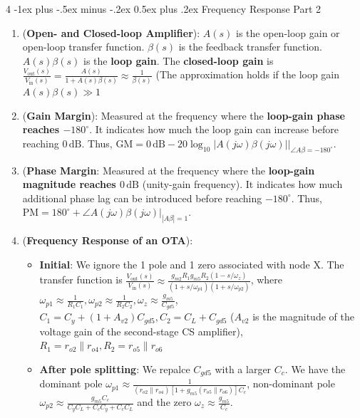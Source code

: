 \documentclass[10pt, landscape]{article}
\makeatletter
\renewcommand{\section}{\@startsection{section}{1}{0mm}%
                                {-1ex plus -.5ex minus -.2ex}%
                                {0.5ex plus .2ex}%
                                {\normalfont\large\bfseries}}
\makeatother
\begin{document}
\begin{multicols}{4}
\section{Frequency Response Part 2}
\begin{enumerate}
    \item (\textbf{Open- and Closed-loop Amplifier}):
    $A(s)$ is the open-loop gain or open-loop transfer function. $\beta(s)$ is the feedback transfer function. $A(s)\beta(s)$ is the \textbf{loop gain}. The \textbf{closed-loop gain} is $\frac{V_{\text{out}}(s)}{V_{\text{in}}(s)}=\frac{A(s)}{1+A(s)\beta(s)}\approx\frac{1}{\beta(s)}$ (The approximation holds if the loop gain $A(s)\beta(s)\gg1$
    \item (\textbf{Gain Margin}): Measured at the frequency where the \textbf{loop-gain phase reaches $-180^\circ$}. It indicates how much the loop gain can increase before reaching $0\,\mathrm{dB}$. Thus, $\mathrm{GM}=0\,\mathrm{dB}-20\log_{10}|A(j\omega)\beta(j\omega)|\big|_{\angle A\beta=-180^\circ}$.
    \item (\textbf{Phase Margin}: Measured at the frequency where the \textbf{loop-gain magnitude reaches $0\,\mathrm{dB}$} (unity-gain frequency). It indicates how much additional phase lag can be introduced before reaching $-180^\circ$. Thus, $\mathrm{PM}=180^\circ+\angle A(j\omega)\beta(j\omega)\big|_{|A\beta|=1}$.
    \item (\textbf{Frequency Response of an OTA}):
    \begin{itemize}
        \item \textbf{Initial}: We ignore the 1 pole and 1 zero associated with node X. The transfer function is $\frac{V_{\text{out}}(s)}{V_{\text{in}}(s)} \approx\frac{g_{m2}R_1g_{m5}R_2(1-s/\omega_z)}{(1+s/\omega_{p1})(1+s/\omega_{p2})}$, where $\omega_{p1}\approx\frac{1}{R_1C_1}, \omega_{p2}\approx\frac{1}{R_2C_2}, \omega_z\approx\frac{g_{m5}}{C_{gd5}}$, $C_1=C_y+(1+A_{v2})C_{gd5}, C_2=C_L+C_{gd5}$ ($A_{v2}$ is the magnitude of the voltage gain of the second-stage CS amplifier), $R_1=r_{o2}\parallel r_{o4}, R_2=r_{o5}\parallel r_{o6}$
        \item \textbf{After pole splitting}: We repalce $C_{gd5}$ with a larger $C_c$. We have the dominant pole $\omega_{p1}\approx\frac{1}{(r_{o2}\parallel r_{o4})[1+g_{m5}(r_{o5}\parallel r_{o6})]C_c}$, non-dominant pole $\omega_{p2}\approx\frac{g_{m5}C_c}{C_yC_L+C_cC_y+C_cC_L}$ and the zero $\omega_z\approx\frac{g_{m5}}{C_c}$.

\end{itemize}
\end{enumerate}
\end{multicols}
\end{document}
